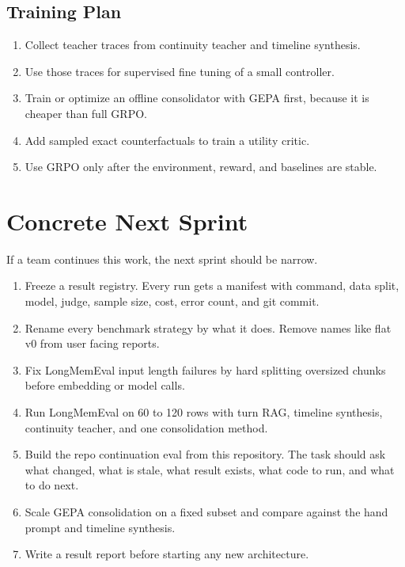 \documentclass[11pt]{article}
\begin{document}
\subsection{Training Plan}

\begin{enumerate}
  \item Collect teacher traces from continuity teacher and timeline synthesis.
  \item Use those traces for supervised fine tuning of a small controller.
  \item Train or optimize an offline consolidator with GEPA first, because it is cheaper than full GRPO.
  \item Add sampled exact counterfactuals to train a utility critic.
  \item Use GRPO only after the environment, reward, and baselines are stable.
\end{enumerate}

\section{Concrete Next Sprint}

If a team continues this work, the next sprint should be narrow.

\begin{enumerate}
  \item Freeze a result registry. Every run gets a manifest with command, data split, model, judge, sample size, cost, error count, and git commit.
  \item Rename every benchmark strategy by what it does. Remove names like flat v0 from user facing reports.
  \item Fix LongMemEval input length failures by hard splitting oversized chunks before embedding or model calls.
  \item Run LongMemEval on 60 to 120 rows with turn RAG, timeline synthesis, continuity teacher, and one consolidation method.
  \item Build the repo continuation eval from this repository. The task should ask what changed, what is stale, what result exists, what code to run, and what to do next.
  \item Scale GEPA consolidation on a fixed subset and compare against the hand prompt and timeline synthesis.
  \item Write a result report before starting any new architecture.
\end{enumerate}
\end{document}
